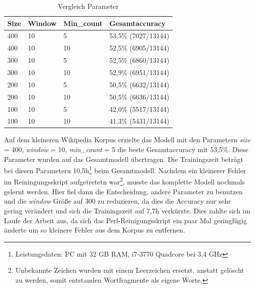 \documentclass[12pt,a4paper]{report}
\begin{document}
\begin{table}[h]
\label{tab:VergleichParameter}
\caption{Vergleich Parameter}
\begin{center}
\begin{tabular}{l|l|l|l}
\textbf{Size} & \textbf{Window} & \textbf{Min\_count} & \textbf{Gesamtaccuracy}\\
\hline	
400 & 10 &  5 & 53,5\% (7027/13144)\\
400 & 10 & 10 & 52,5\% (6905/13144)\\
300 & 10 &  5 & 52,5\% (6860/13144)\\
300 & 10 & 10 & 52,9\% (6951/13144)\\
200 & 10 &  5 & 50,5\% (6632/13144)\\
200 & 10 & 10 & 50,5\% (6636/13144)\\
100 & 10 &  5 & 42,0\% (5517/13144)\\
100 & 10 & 10 & 41,3\% (5431/13144)\\

\end{tabular}
\end{center}
\end{table}

Auf dem kleineren Wikipedia Korpus erzielte das Modell mit den Parametern 
\textit{size} = 400, \textit{window} = 10, \textit{min\_count} = 5
 die beste Gesamtaccuracy mit 53,5\%. Diese Parameter wurden auf das Gesamtmodell übertragen. Die Trainingszeit beträgt bei diesen Parametern 10,5h\footnote{Leistungsdaten: PC mit 32 GB RAM, i7-3770 Quadcore bei 3,4 GHz} beim Gesamtmodell. Nachdem ein kleinerer Fehler im Reiningungsskript aufgetretetn war\footnote{Unbekannte Zeichen wurden mit einem Leerzeichen ersetzt, anstatt gelöscht zu werden, somit entstanden Wortfragmente als eigene Worte.}, musste das komplette Modell nochmals gelernt werden. Hier fiel dann die Entscheidung, andere Parameter zu benutzen und die \textit{window} Größe auf 300 zu reduzieren, da dies die Accuracy nur sehr gering verändert und sich die Trainingszeit auf 7,7h verkürzte. Dies zahlte sich im Laufe der Arbeit aus, da sich das Perl-Reinigungsskript ein paar Mal geringfügig änderte um so kleinere Fehler aus dem Korpus zu entfernen.\\


	
\end{document}

